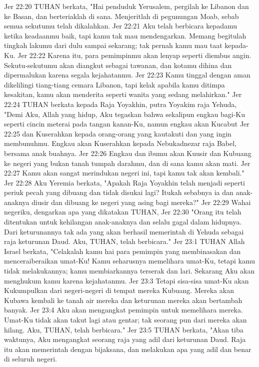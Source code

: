 Jer 22:20  TUHAN berkata, "Hai penduduk Yerusalem, pergilah ke Libanon dan ke Basan, dan berteriaklah di sana. Menjeritlah di pegunungan Moab, sebab semua sekutumu telah dikalahkan.
Jer 22:21  Aku telah berbicara kepadamu ketika keadaanmu baik, tapi kamu tak mau mendengarkan. Memang begitulah tingkah lakumu dari dulu sampai sekarang; tak pernah kamu mau taat kepada-Ku.
Jer 22:22  Karena itu, para pemimpinmu akan lenyap seperti diembus angin. Sekutu-sekutumu akan diangkut sebagai tawanan, dan kotamu dihina dan dipermalukan karena segala kejahatanmu.
Jer 22:23  Kamu tinggal dengan aman dikelilingi tiang-tiang cemara Libanon, tapi kelak apabila kamu ditimpa kesakitan, kamu akan menderita seperti wanita yang sedang melahirkan."
Jer 22:24  TUHAN berkata kepada Raja Yoyakhin, putra Yoyakim raja Yehuda, "Demi Aku, Allah yang hidup, Aku tegaskan bahwa sekalipun engkau bagi-Ku seperti cincin meterai pada tangan kanan-Ku, namun engkau akan Kucabut
Jer 22:25  dan Kuserahkan kepada orang-orang yang kautakuti dan yang ingin membunuhmu. Engkau akan Kuserahkan kepada Nebukadnezar raja Babel, bersama anak buahnya.
Jer 22:26  Engkau dan ibumu akan Kuusir dan Kubuang ke negeri yang bukan tanah tumpah darahmu, dan di sana kamu akan mati.
Jer 22:27  Kamu akan sangat merindukan negeri ini, tapi kamu tak akan kembali."
Jer 22:28  Aku Yeremia berkata, "Apakah Raja Yoyakhin telah menjadi seperti periuk pecah yang dibuang dan tidak disukai lagi? Itukah sebabnya ia dan anak-anaknya diusir dan dibuang ke negeri yang asing bagi mereka?"
Jer 22:29  Wahai negeriku, dengarkan apa yang dikatakan TUHAN,
Jer 22:30  "Orang itu telah ditentukan untuk kehilangan anak-anaknya dan selalu gagal dalam hidupnya. Dari keturunannya tak ada yang akan berhasil memerintah di Yehuda sebagai raja keturunan Daud. Aku, TUHAN, telah berbicara."
Jer 23:1  TUHAN Allah Israel berkata, "Celakalah kamu hai para pemimpin yang membinasakan dan menceraiberaikan umat-Ku! Kamu seharusnya memelihara umat-Ku, tetapi kamu tidak melakukannya; kamu membiarkannya terserak dan lari. Sekarang Aku akan menghukum kamu karena kejahatanmu.
Jer 23:3  Tetapi sisa-sisa umat-Ku akan Kukumpulkan dari negeri-negeri di tempat mereka Kubuang. Mereka akan Kubawa kembali ke tanah air mereka dan keturunan mereka akan bertambah banyak.
Jer 23:4  Aku akan mengangkat pemimpin untuk memelihara mereka. Umat-Ku tidak akan takut lagi atau gentar; tak seorang pun dari mereka akan hilang. Aku, TUHAN, telah berbicara."
Jer 23:5  TUHAN berkata, "Akan tiba waktunya, Aku mengangkat seorang raja yang adil dari keturunan Daud. Raja itu akan memerintah dengan bijaksana, dan melakukan apa yang adil dan benar di seluruh negeri.
